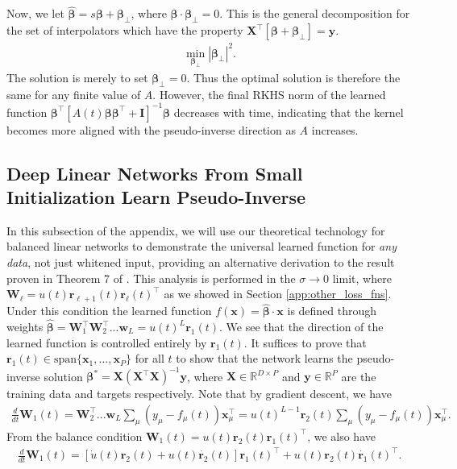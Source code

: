 \documentclass{article} %
\def\x{\bm x}
\def\w{\bm w}
\def\W{\bm W}
\begin{document}
\begin{appendix}
Now, we let $\bm{\hat \beta} = s\bm \beta + \bm \beta_{\perp}$, where $\bm\beta \cdot \bm \beta_{\perp} = 0$. This is the general decomposition for the set of interpolators which have the property $\bm X^\top \left[ \bm \beta + \bm\beta_{\perp} \right] = \bm y$.  
\begin{align}
    \min_{\bm\beta_{\perp}} |\bm \beta_{\perp}|^2.
\end{align}
The solution is merely to set $\bm\beta_{\perp} = 0$. Thus the optimal solution is therefore the same for any finite value of $A$. However, the final RKHS norm of the learned function $\bm\beta^\top \left[A(t) \bm \beta \bm \beta^\top + \bm I \right]^{-1} \bm\beta$ decreases with time, indicating that the kernel becomes more aligned with the pseudo-inverse direction as $A$ increases.

\subsection{Deep Linear Networks From Small Initialization Learn Pseudo-Inverse}\label{app:inductive_deep_linear}

In this subsection of the appendix, we will use our theoretical technology for balanced linear networks to demonstrate the universal learned function for \textit{any data}, not just whitened input, providing an alternative derivation to the result proven in Theorem 7 of \cite{yun2020unifying}. This analysis is performed in the $\sigma \to 0$ limit, where $\bm W_{\ell} = u(t) \bm r_{\ell+1}(t) \bm r_{\ell}(t)^\top$ as we showed in Section \ref{app:other_loss_fns}. Under this condition the learned function $f(\x) = \bm{\hat \beta} \cdot \x$ is defined through weights $\bm{\hat{\beta}} = \bm W_1^\top \W_2^\top ... \w_L = u(t)^L \bm r_1(t)$. We see that the direction of the learned function is controlled entirely by $\bm r_1(t)$. It suffices to prove that $\bm r_1(t) \in \text{span}\{\x_1,...,\x_P\}$ for all $t$ to show that the network learns the pseudo-inverse solution $\bm \beta^* = \bm X (\bm X^\top \bm X)^{-1} \bm y$, where $\bm X \in \mathbb{R}^{D \times P}$ and $\bm y \in \mathbb{R}^{P}$ are the training data and targets respectively.  Note that by gradient descent, we have
\begin{align}
    \frac{d}{dt} \bm W_1(t) = \bm W_2^\top ... \w_L  \sum_\mu  (y_\mu - f_\mu(t)) \x_\mu^\top = u(t)^{L-1} \bm r_2(t) \sum_\mu  (y_\mu - f_\mu(t)) \x_\mu^\top.
\end{align}
From the balance condition $\bm W_1(t) = u(t) \bm r_2(t) \bm r_1(t)^\top$, we also have
\begin{align}
    \frac{d}{dt} \bm W_1(t) = \left[ \dot{u}(t) \bm r_2(t) + u(t) \dot{\bm r_2}(t) \right] \bm r_1(t)^\top + u(t) \bm r_2(t) \dot{\bm r_1}(t)^\top.
\end{align}


\end{appendix}
\end{document}
